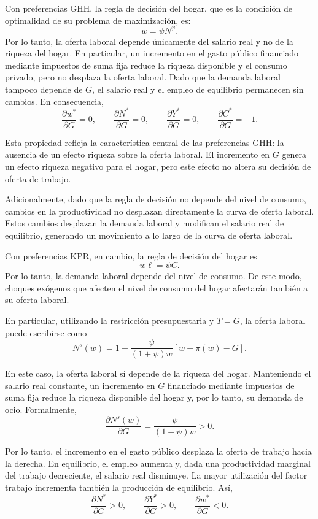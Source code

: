 \documentclass[11pt]{article}
\begin{document}
Con preferencias GHH, la regla de decisión del hogar, que es la condición de optimalidad de su problema de maximización, es:
\[
w=\psi N^\varphi.
\]
Por lo tanto, la oferta laboral depende únicamente del salario real y no de la riqueza del hogar. En particular, un incremento en el gasto público financiado mediante impuestos de suma fija reduce la riqueza disponible y el consumo privado, pero no desplaza la oferta laboral. Dado que la demanda laboral tampoco depende de $G$, el salario real y el empleo de equilibrio permanecen sin cambios. En consecuencia,
\[
\frac{\partial w^*}{\partial G}=0,
\qquad
\frac{\partial N^*}{\partial G}=0,
\qquad
\frac{\partial Y^*}{\partial G}=0,
\qquad
\frac{\partial C^*}{\partial G}=-1.
\]

Esta propiedad refleja la característica central de las preferencias GHH: la ausencia de un efecto riqueza sobre la oferta laboral. El incremento en $G$ genera un efecto riqueza negativo para el hogar, pero este efecto no altera
su decisión de oferta de trabajo.

Adicionalmente, dado que la regla de decisión no depende del nivel de consumo, cambios en la productividad no desplazan directamente la curva de oferta laboral. Estos cambios desplazan la demanda laboral y modifican el salario real de equilibrio, generando un movimiento a lo largo de la curva de oferta laboral.

Con preferencias KPR, en cambio, la regla de decisión del hogar es
\[
w\ell=\psi C.
\]
Por lo tanto, la demanda laboral depende del nivel de consumo. De este modo, choques exógenos que afecten el nivel de consumo del hogar afectarán también a su oferta laboral. 

En particular, utilizando la restricción presupuestaria y $T=G$, la oferta laboral puede escribirse como
\[
N^s(w)
=
1-
\frac{\psi}{(1+\psi)w}
\left[
w+\pi(w)-G
\right].
\]

En este caso, la oferta laboral sí depende de la riqueza del hogar. Manteniendo el salario real constante, un incremento en $G$ financiado mediante impuestos de suma fija reduce la riqueza disponible del hogar y, por lo tanto, su demanda
de ocio. Formalmente,
\[
\frac{\partial N^s(w)}{\partial G}
=
\frac{\psi}{(1+\psi)w}
>0.
\]

Por lo tanto, el incremento en el gasto público desplaza la oferta de trabajo hacia la derecha. En equilibrio, el empleo aumenta y, dada una productividad marginal del trabajo decreciente, el salario real disminuye. La mayor utilización del factor trabajo incrementa también la producción de equilibrio. Así,
\[
\frac{\partial N^*}{\partial G}>0,
\qquad
\frac{\partial Y^*}{\partial G}>0,
\qquad
\frac{\partial w^*}{\partial G}<0.
\]
\end{document}
